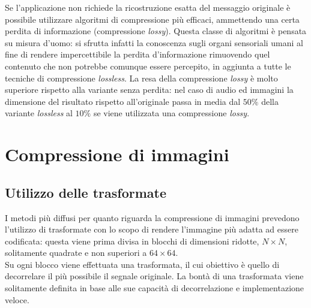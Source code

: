 Se l'applicazione non richiede la ricostruzione esatta del messaggio originale 
è possibile utilizzare algoritmi di compressione più efficaci, %
ammettendo una certa perdita di informazione (compressione \emph{lossy}).
Questa classe di algoritmi è pensata su misura d'uomo:
si sfrutta infatti la conoscenza sugli organi sensoriali umani al 
fine di rendere impercettibile la perdita d'informazione rimuovendo quel  
contenuto che non potrebbe comunque essere percepito, in
aggiunta a tutte le tecniche di compressione \emph{lossless}.
La resa della compressione \emph{lossy} è molto superiore rispetto 
alla variante senza perdita: nel caso di audio ed immagini la dimensione del 
risultato rispetto all'originale passa in media dal $50\%$ della 
variante \emph{lossless} al $10\%$ se viene utilizzata una compressione 
\emph{lossy}.


\section{Compressione di immagini}



\subsection{Utilizzo delle trasformate}

I metodi più diffusi per quanto riguarda la compressione di immagini prevedono 
l'utilizzo di trasformate con lo scopo di rendere l'immagine più adatta ad 
essere codificata: questa viene prima divisa in blocchi di dimensioni ridotte, 
$N\times N$, solitamente quadrate e non superiori a $64\times64$.\\

Su ogni blocco viene effettuata una trasformata, 
il cui obiettivo è quello di decorrelare il più possibile il segnale originale.
La bontà di una trasformata viene solitamente definita in base alle sue 
capacità di decorrelazione e implementazione veloce.\\

